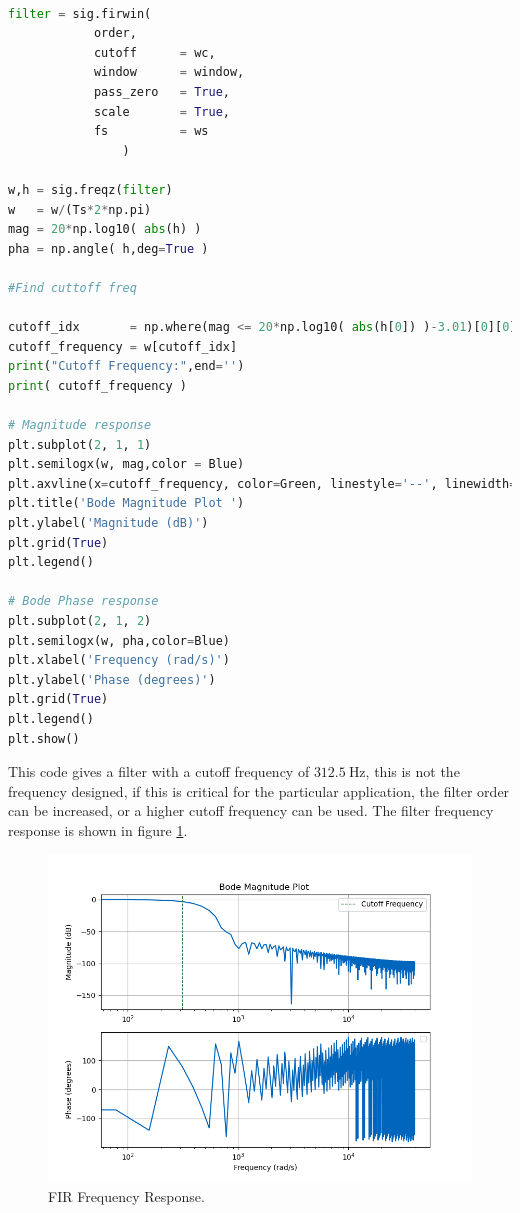 \vspace{1cm}
\label{list:FirDesign}
\begin{lstlisting}[language=python, caption = Specification Definition]

filter = sig.firwin(
            order,
            cutoff      = wc, 
            window      = window, 
            pass_zero   = True, 
            scale       = True,
            fs          = ws
                )

w,h = sig.freqz(filter)
w   = w/(Ts*2*np.pi)
mag = 20*np.log10( abs(h) )
pha = np.angle( h,deg=True )   

#Find cuttoff freq

cutoff_idx       = np.where(mag <= 20*np.log10( abs(h[0]) )-3.01)[0][0]
cutoff_frequency = w[cutoff_idx]
print("Cutoff Frequency:",end='')
print( cutoff_frequency )

# Magnitude response
plt.subplot(2, 1, 1)
plt.semilogx(w, mag,color = Blue)
plt.axvline(x=cutoff_frequency, color=Green, linestyle='--', linewidth=1,label="Cutoff Frequency")
plt.title('Bode Magnitude Plot ')
plt.ylabel('Magnitude (dB)')
plt.grid(True)
plt.legend()

# Bode Phase response
plt.subplot(2, 1, 2)
plt.semilogx(w, pha,color=Blue)
plt.xlabel('Frequency (rad/s)')
plt.ylabel('Phase (degrees)')
plt.grid(True)
plt.legend()
plt.show()
\end{lstlisting}

This code gives a filter with a cutoff frequency of $312.5~\si{\Hz}$, this is not the frequency designed, if this is critical for the particular application, the filter order can be increased, or a higher cutoff frequency can be used. The filter frequency response is shown in figure \ref{fig:FIRBode}.

\begin{figure}[H]
    \centering
    \includegraphics*[scale = 0.5]{Images/FIRBode.png}
    \caption{FIR Frequency Response.}
    \label{fig:FIRBode}
\end{figure}

